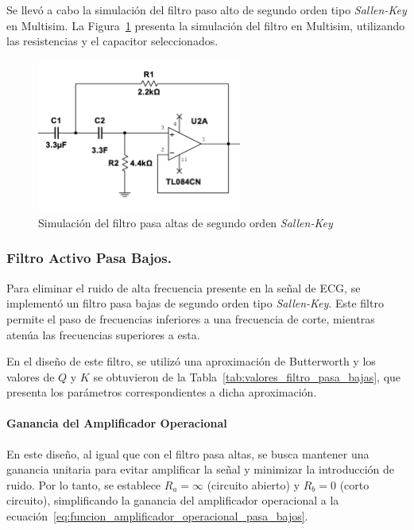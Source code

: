             Se llevó a cabo la simulación del filtro paso alto de segundo orden tipo \textit{Sallen-Key} en Multisim. La Figura~\ref{fig:Simulacion_Filtro_Pasa_Altas} presenta la simulación del filtro en Multisim, utilizando las resistencias y el capacitor seleccionados.

            \begin{figure}[H]
                \centering
                \includegraphics[width=0.6\textwidth]{img/Desarrollo/multisim_pasaAltos.png}
                \caption[Simulación del filtro pasa altas de segundo orden \textit{Sallen-Key}.]{Simulación del filtro pasa altas de segundo orden \textit{Sallen-Key}\footnotemark}
                \label{fig:Simulacion_Filtro_Pasa_Altas}
            \end{figure}

        \subsubsection{Filtro Activo Pasa Bajos.}

            Para eliminar el ruido de alta frecuencia presente en la señal de ECG, se implementó un filtro pasa bajas de segundo orden tipo \textit{Sallen-Key}. Este filtro permite el paso de frecuencias inferiores a una frecuencia de corte, mientras atenúa las frecuencias superiores a esta.

            En el diseño de este filtro, se utilizó una aproximación de Butterworth y los valores de $Q$ y $K$ se obtuvieron de la Tabla~\ref{tab:valores_filtro_pasa_bajas}, que presenta los parámetros correspondientes a dicha aproximación.

            \paragraph{Ganancia del Amplificador Operacional}
            En este diseño, al igual que con el filtro pasa altas, se busca mantener una ganancia unitaria para evitar amplificar la señal y minimizar la introducción de ruido. Por lo tanto, se establece $R_a = \infty$ (circuito abierto) y $R_b = 0$ (corto circuito), simplificando la ganancia del amplificador operacional a la ecuación~\ref{eq:funcion_amplificador_operacional_pasa_bajos}.

